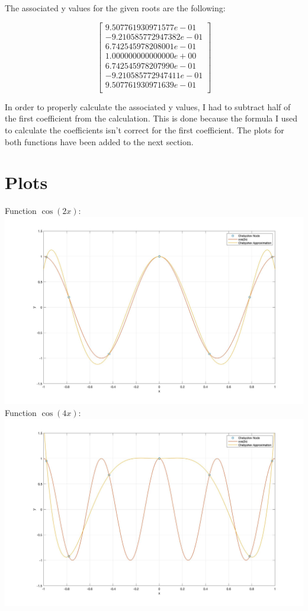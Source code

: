 \documentclass{article}
\begin{document}
The associated y values for the given roots are the following:

$$
\begin{bmatrix} 
9.507761930971577e-01\\
-9.210585772947382e-01\\
6.742545978208001e-01\\
1.000000000000000e+00\\
6.742545978207990e-01\\
-9.210585772947411e-01\\
9.507761930971639e-01\\
\end{bmatrix}
$$

In order to properly calculate the associated y values, I had to subtract half of the first coefficient from the calculation. This is done because the formula I used to calculate the coefficients isn't correct for the first coefficient. The plots for both functions have been added to the next section.

\section{Plots}
Function $\cos(2x)$:\\
\includegraphics[width=\textwidth,height=\textheight,keepaspectratio]{cos2x.jpg}\\
Function $\cos(4x)$:\\
\includegraphics[width=\textwidth,height=\textheight,keepaspectratio]{cos4x.jpg}
\end{document}
